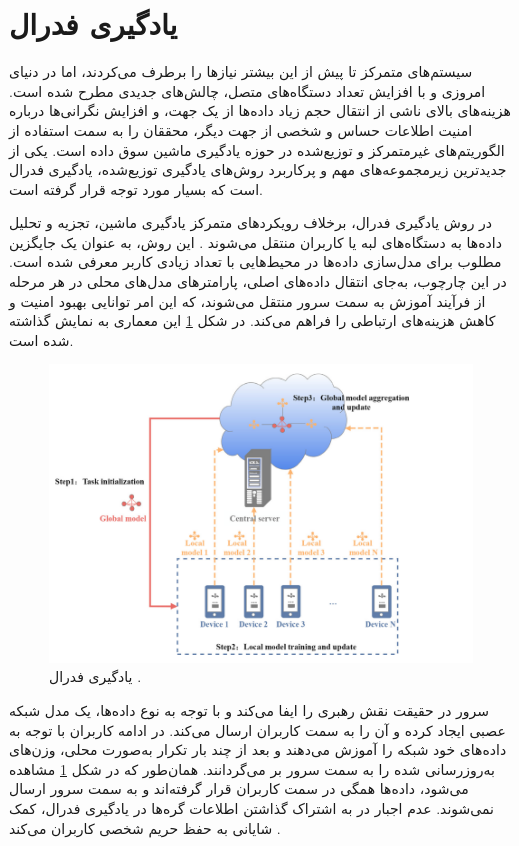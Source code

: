 \section{
	یادگیری فدرال%
}
سیستم‌های متمرکز تا پیش از این بیشتر نیازها را برطرف می‌کردند، اما در دنیای امروزی و با افزایش تعداد دستگاه‌های متصل، چالش‌های جدیدی مطرح شده است. هزینه‌های بالای ناشی از انتقال حجم زیاد داده‌ها از یک جهت، و افزایش نگرانی‌ها درباره امنیت اطلاعات حساس و شخصی از جهت دیگر، محققان را به سمت استفاده از الگوریتم‌های غیرمتمرکز و توزیع‌شده در حوزه یادگیری ماشین سوق داده است. یکی از جدیدترین زیرمجموعه‌های مهم و پرکاربرد روش‌های یادگیری توزیع‌شده، یادگیری فدرال است که بسیار مورد توجه قرار گرفته است.


در روش یادگیری فدرال، برخلاف رویکردهای متمرکز یادگیری ماشین، تجزیه و تحلیل داده‌ها به دستگاه‌های لبه%
یا کاربران%
منتقل می‌شوند
\cite{ma2022state}.
این روش، به عنوان یک جایگزین مطلوب برای مدل‌سازی داده‌ها در محیط‌هایی با تعداد زیادی کاربر معرفی شده است. در این چارچوب، به‌جای انتقال داده‌های اصلی، پارامترهای مدل‌های محلی در هر مرحله از فرآیند آموزش به سمت سرور منتقل می‌شوند، که این امر توانایی بهبود امنیت و کاهش هزینه‌های ارتباطی را فراهم می‌کند.
در شکل
\ref{federated_learning}
این معماری به نمایش گذاشته شده است.


 \begin{figure}[b!]
	\centering
	\includegraphics[scale=0.595]{images/chap1/federated_learning.png}%
	\caption{%
		یادگیری فدرال 
		\cite{ma2022state}%
		.
	}
	\label{federated_learning}
	\centering
\end{figure}

سرور در حقیقت نقش رهبری را ایفا می‌کند و با توجه به نوع داده‌ها، یک مدل شبکه عصبی%
ایجاد کرده و آن را به سمت کاربران ارسال می‌کند. در ادامه کاربران با توجه به داده‌های خود شبکه را آموزش می‌دهند و بعد از چند بار تکرار به‌صورت محلی، وزن‌های به‌روزرسانی شده را به سمت سرور بر می‌گردانند. همان‌طور که در شکل
\ref{federated_learning}
مشاهده می‌شود، داده‌ها همگی در سمت کاربران قرار گرفته‌اند و به سمت سرور ارسال نمی‌شوند. عدم اجبار در به اشتراک گذاشتن اطلاعات گره‌ها در یادگیری فدرال، کمک شایانی به حفظ حریم شخصی کاربران می‌کند
\cite{smith2017federated}.



